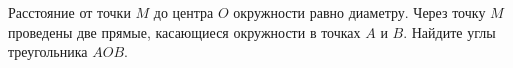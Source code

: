 \begin{ex}
	\begin{condition}
		Расстояние от точки \( M  \) до центра \( O  \) окружности равно диаметру. Через точку \( M  \) проведены две прямые, касающиеся окружности в точках \( A \) и \( B \). Найдите углы треугольника \( AOB \).
	\end{condition}
\end{ex}